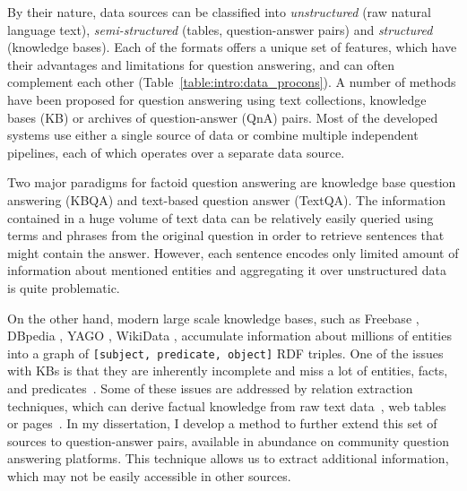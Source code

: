 By their nature, data sources can be classified into \textit{unstructured} (\eg raw natural language text), \textit{semi-structured} (\eg tables, question-answer pairs) and \textit{structured} (\eg knowledge bases).
Each of the formats offers a unique set of features, which have their advantages and limitations for question answering, and can often complement each other (Table~\ref{table:intro:data_procons}).
A number of methods have been proposed for question answering using text collections, knowledge bases (KB) or archives of question-answer (QnA) pairs.
Most of the developed systems use either a single source of data or combine multiple independent pipelines, each of which operates over a separate data source.

Two major paradigms for factoid question answering are knowledge base question answering (KBQA) and text-based question answer (TextQA).
The information contained in a huge volume of text data can be relatively easily queried using terms and phrases from the original question in order to retrieve sentences that might contain the answer.
However, each sentence encodes only limited amount of information about mentioned entities and aggregating it over unstructured data is quite problematic.

On the other hand, modern large scale knowledge bases, such as Freebase \cite{Bollacker:2008:FCC:1376616.1376746}, DBpedia \cite{auer2007dbpedia}, YAGO \cite{yago3}, WikiData \cite{vrandevcic2014wikidata}, accumulate information about millions of entities into a graph of \texttt{[subject, predicate, object]} RDF triples.
One of the issues with KBs is that they are inherently incomplete and miss a lot of entities, facts, and predicates~\cite{Dong:2014:KVW:2623330.2623623}.
Some of these issues are addressed by relation extraction techniques, which can derive factual knowledge from raw text data~\cite{MintzBSJ09}, web tables~\cite{Cafarella:2008:WEP:1453856.1453916} or pages~\cite{Cafarella:2009:WES:1519103.1519112}.
In my dissertation, I develop a method to further extend this set of sources to question-answer pairs, available in abundance on community question answering platforms.
This technique allows us to extract additional information, which may not be easily accessible in other sources.

